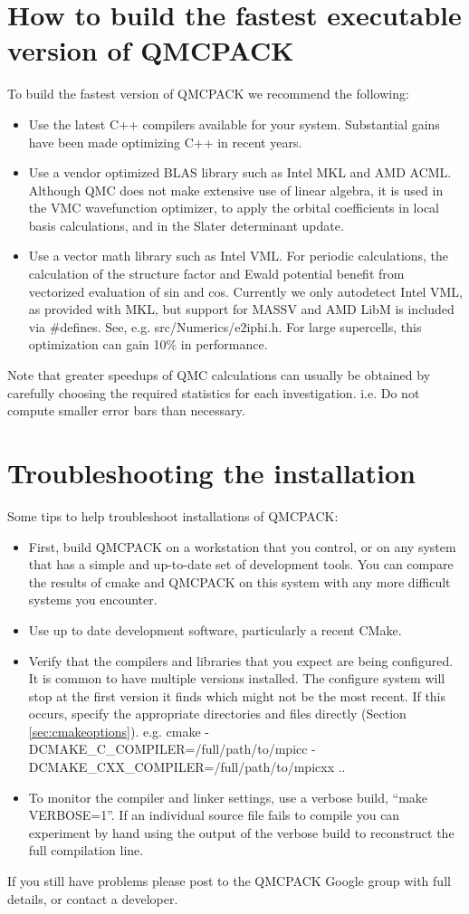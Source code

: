 \section{How to build the fastest executable version of QMCPACK}
\label{sec:buildperformance}
To build the fastest version of QMCPACK we recommend the following:
\begin{itemize}
\item Use the latest C++ compilers available for your
  system. Substantial gains have been made optimizing C++ in recent
  years.
\item Use a vendor optimized BLAS library such as Intel MKL and AMD ACML. Although
  QMC does not make extensive use of linear algebra, it is used in the
  VMC wavefunction optimizer, to apply the orbital coefficients in local basis
  calculations, and in the Slater determinant update.
\item Use a vector math library such as Intel VML.  For periodic
  calculations, the calculation of the structure factor and Ewald
  potential benefit from vectorized evaluation of sin and
  cos. Currently we only autodetect Intel VML, as provided with MKL,
  but support for MASSV and AMD LibM is included via \#defines. See,
  e.g. src/Numerics/e2iphi.h. For
  large supercells, this optimization can gain 10\% in performance.
\end{itemize}

Note that greater speedups of QMC calculations can usually be obtained by
carefully choosing the required statistics for each
investigation. i.e. Do not compute smaller error bars than necessary.

\section{Troubleshooting the installation}
\label{sec:troubleshoot}
Some tips to help troubleshoot installations of QMCPACK:
\begin{itemize}
\item First, build QMCPACK on a workstation that you control, or on any
  system that has a simple and up-to-date set of development
  tools. You can compare the results of cmake and QMCPACK on this
  system with any more difficult systems you encounter.
\item Use up to date development software, particularly a recent
  CMake.
\item Verify that the compilers and libraries that you expect are
  being configured. It is common to have multiple versions
  installed. The configure system will stop at the first version it
  finds which might not be the most recent. If this occurs, specify the appropriate
  directories and files directly (Section
  \ref{sec:cmakeoptions}). e.g. cmake -DCMAKE\_C\_COMPILER=/full/path/to/mpicc -DCMAKE\_CXX\_COMPILER=/full/path/to/mpicxx ..
\item To monitor the compiler and linker settings, use a verbose build, ``make
  VERBOSE=1''. If an individual source file fails to compile you
  can experiment by hand using the output of the verbose build to
  reconstruct the full compilation line.
\end{itemize}

If you still have problems please post to the QMCPACK Google group with full
details, or contact a developer.
